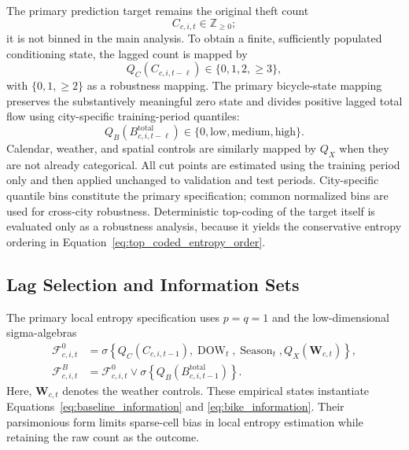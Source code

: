 \documentclass[applsci,article,submit,moreauthors]{Definitions/mdpi}
\begin{document}
The primary prediction target remains the original theft count
\begin{equation}
C_{c,i,t}\in\mathbb{Z}_{\geq0};
\end{equation}
it is not binned in the main analysis. To obtain a finite, sufficiently
populated conditioning state, the lagged count is mapped by
\begin{equation}
Q_C(C_{c,i,t-\ell})\in\{0,1,2,\geq3\},
\end{equation}
with \(\{0,1,\geq2\}\) as a robustness mapping. The primary bicycle-state
mapping preserves the substantively meaningful zero state and divides
positive lagged total flow using city-specific training-period quantiles:
\begin{equation}
Q_B(B^{\mathrm{total}}_{c,i,t-\ell})
\in\{0,\text{low},\text{medium},\text{high}\}.
\end{equation}
Calendar, weather, and spatial controls are similarly mapped by \(Q_X\)
when they are not already categorical. All cut points are estimated using
the training period only and then applied unchanged to validation and test
periods. City-specific quantile bins constitute the primary specification;
common normalized bins are used for cross-city robustness. Deterministic
top-coding of the target itself is evaluated only as a robustness analysis,
because it yields the conservative entropy ordering in
Equation~\eqref{eq:top_coded_entropy_order}.

\subsection{Lag Selection and Information Sets}
\label{subsec:lag_selection}

The primary local entropy specification uses \(p=q=1\) and the
low-dimensional sigma-algebras
\begin{align}
\mathcal{F}^{0}_{c,i,t}
&=
\sigma\!\left\{
Q_C(C_{c,i,t-1}),
\operatorname{DOW}_t,
\operatorname{Season}_t,
Q_X(\mathbf{W}_{c,t})
\right\},
\label{eq:empirical_baseline_information}\\
\mathcal{F}^{B}_{c,i,t}
&=
\mathcal{F}^{0}_{c,i,t}
\vee
\sigma\!\left\{
Q_B(B^{\mathrm{total}}_{c,i,t-1})
\right\}.
\label{eq:empirical_bicycle_information}
\end{align}
Here, \(\mathbf{W}_{c,t}\) denotes the weather controls. These empirical
states instantiate Equations~\eqref{eq:baseline_information} and
\eqref{eq:bike_information}. Their parsimonious form limits sparse-cell bias
in local entropy estimation while retaining the raw count as the outcome.
\end{document}
